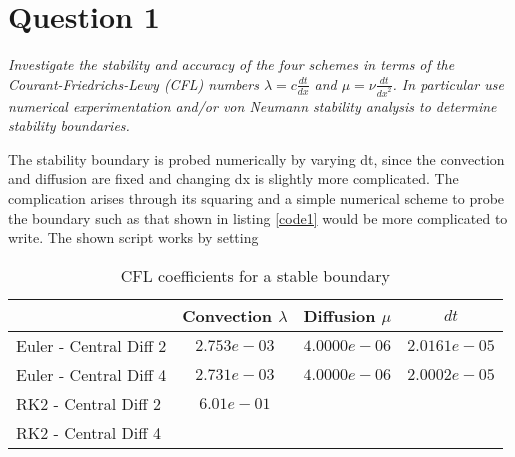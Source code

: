 \section*{Question 1}
\emph{Investigate the stability and accuracy of the four schemes in terms of the Courant-Friedrichs-Lewy (CFL) numbers $\lambda = c \tfrac{dt}{dx}$ and $\mu = \nu \tfrac{dt}{{dx}^2}$. In particular use numerical experimentation and/or von Neumann stability analysis to determine stability boundaries.}

The stability boundary is probed numerically by varying dt, since the convection and diffusion are fixed and changing dx is slightly more complicated. The complication arises through its squaring and a simple numerical scheme to probe the boundary such as that shown in listing \ref{code1} would be more complicated to write. The shown script works by setting

\label{code1}

\begin{table}[ht]
\caption{CFL coefficients for a stable boundary}
\label{tbl1}
\centering
\begin{tabular}{l|c|c|c}
& Convection $\lambda$ & Diffusion $\mu$  & $dt$\\ \hline
Euler - Central Diff 2 & $2.753e-03$ & $4.0000e-06$ & $2.0161e-05$\\
Euler - Central Diff 4 & $2.731e-03$ & $4.0000e-06$ & $2.0002e-05$\\
RK2 - Central Diff 2 & $6.01e-01$ & \\
RK2 - Central Diff 4 &\\
\end{tabular}
\end{table}


%
%
%
%
